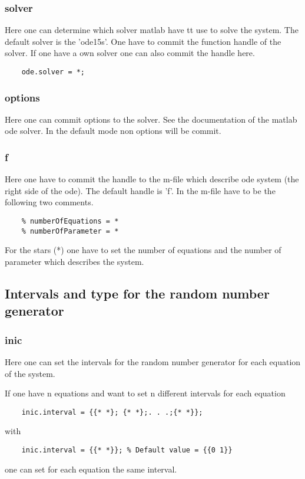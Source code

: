 \documentclass[12pt,a4paper]{article}
\begin{document}
\subsubsection*{solver}
Here one can determine which solver matlab have tt use to solve the system. The default solver is the 'ode15s'. One have to commit the function handle of the solver. If one have a own solver one can also commit the handle here. 

\begin{lstlisting}
	ode.solver = *;
\end{lstlisting} 
 
\subsubsection*{options}
Here one can commit options to the solver. See the documentation of the matlab ode solver. In the default mode non options will be commit.

\subsubsection*{f}
Here one have to commit the handle to the m-file which describe ode system (the right side of the ode). The default handle is 'f'. In the m-file have to be the following two comments.  

\begin{lstlisting}
	% numberOfEquations = *
	% numberOfParameter = *
\end{lstlisting}

For the stars (*) one have to set the number of equations and the number of parameter which describes the system.  

\subsection{Intervals and type for the random number generator}
\subsubsection*{inic}
Here one can set the intervals for the random number generator for each equation of the system. 

If one have n equations and want to set n different intervals for each equation
\begin{lstlisting}
	inic.interval = {{* *}; {* *};. . .;{* *}};
\end{lstlisting} 
with 
\begin{lstlisting}
	inic.interval = {{* *}}; % Default value = {{0 1}}
\end{lstlisting}
one can set for each equation the same interval.\\ 
\end{document}
